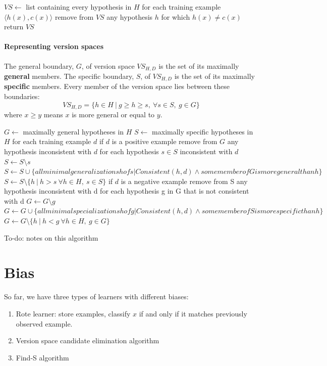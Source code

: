 \begin{algorithm}[caption={List-then-eliminate.}, label={alg8}]
$VS \leftarrow$  list containing every hypothesis in $H$
for each training example $\langle h(x), c(x) \rangle$
    remove from $VS$ any hypothesis $h$ for which $h(x) \neq c(x)$
return $VS$
\end{algorithm}

\paragraph{Representing version spaces} The general boundary, $G$, of version space $VS_{H, D}$ is the set of its maximally \textbf{general} members. The specific boundary, $S$, of $VS_{H, D}$ is the set of its maximally \textbf{specific} members. Every member of the version space lies between these boundaries:
\begin{equation*}
    VS_{H, D} = \{ h \in H ~|~ g \geq h \geq s,~ \forall s \in S,~ g \in G \}
\end{equation*}
where $x \geq y$ means $x$ is more general or equal to $y$.


\begin{algorithm}[caption={Candidate elimination.}, label={alg9}]
$G \leftarrow$ maximally general hypotheses in $H$
$S \leftarrow$ maximally specific hypotheses in $H$
for each training example $d$
    if $d$ is a positive example
        remove from $G$ any hypothesis inconsistent with $d$
        for each hypothesis $s \in S$ inconsistent with $d$
            $S \leftarrow S \setminus s$
            $S \leftarrow S \cup \{ all minimal generalizations h of s | Consistent(h, d) \wedge  some member of G is more general than h \}$
            $S \leftarrow S \setminus \{ h ~|~ h > s ~ \forall h \in H,~ s \in S \}$
    if $d$ is a negative example 
        remove from S any hypothesis inconsistent with d
        for each hypothesis g in G that is not consistent with d
            $G \leftarrow G \setminus g$
            $G \leftarrow G \cup \{all minimal specializations h of g | Consistent(h, d) \wedge some member of S is more specific than h \}$
            $G \leftarrow G \setminus \{ h ~|~ h < g ~ \forall h \in H,~ g \in G \}$

\end{algorithm}
To-do: notes on this algorithm

\section{Bias}
So far, we have three types of learners with different biases:
\begin{enumerate}
    \item Rote learner: store examples, classify $x$ if and only if it matches previously observed example.
    \item Version space candidate elimination algorithm
    \item Find-S algorithm
\end{enumerate}
